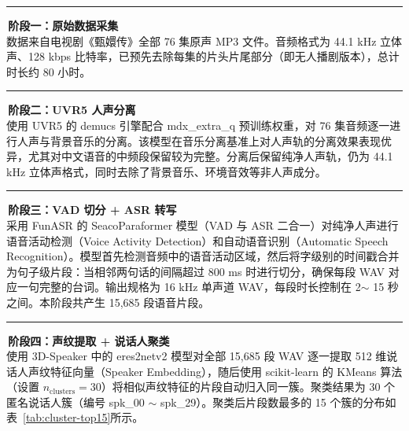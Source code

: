 \documentclass[12pt,a4paper]{article}
\begin{document}
{\color{Amid}\rule{4pt}{0pt}}\,\textbf{\color{Amid}阶段一：原始数据采集}\\[3pt]
\hspace*{2em}数据来自电视剧《甄嬛传》全部 76 集原声 MP3 文件。音频格式为 44.1 kHz 立体声、128 kbps 比特率，已预先去除每集的片头片尾部分（即无人播剧版本），总计时长约 80 小时。

{\color{Amid}\rule{4pt}{0pt}}\,\textbf{\color{Amid}阶段二：UVR5 人声分离}\\[3pt]
\hspace*{2em}使用 UVR5\cite{uvr5} 的 demucs\cite{defossez2021demucs} 引擎配合 mdx\_extra\_q 预训练权重，对 76 集音频逐一进行人声与背景音乐的分离。该模型在音乐分离基准上对人声轨的分离效果表现优异，尤其对中文语音的中频段保留较为完整。分离后保留纯净人声轨，仍为 44.1 kHz 立体声格式，同时去除了背景音乐、环境音效等非人声成分。

{\color{Amid}\rule{4pt}{0pt}}\,\textbf{\color{Amid}阶段三：VAD 切分 + ASR 转写}\\[3pt]
\hspace*{2em}采用 FunASR\cite{funasr} 的 SeacoParaformer 模型（VAD 与 ASR 二合一）对纯净人声进行语音活动检测（Voice Activity Detection）和自动语音识别（Automatic Speech Recognition）。模型首先检测音频中的语音活动区域，然后将字级别的时间戳合并为句子级片段：当相邻两句话的间隔超过 800 ms 时进行切分，确保每段 WAV 对应一句完整的台词。输出规格为 16 kHz 单声道 WAV，每段时长控制在 2$\sim$ 15 秒之间。本阶段共产生 15,685 段语音片段。

{\color{Amid}\rule{4pt}{0pt}}\,\textbf{\color{Amid}阶段四：声纹提取 + 说话人聚类}\\[3pt]
\hspace*{2em}使用 3D-Speaker\cite{3d-speaker} 中的 eres2netv2 模型对全部 15,685 段 WAV 逐一提取 512 维说话人声纹特征向量（Speaker Embedding），随后使用 scikit-learn\cite{sklearn} 的 KMeans 算法（设置 $n_\text{clusters}=30$）将相似声纹特征的片段自动归入同一簇。聚类结果为 30 个匿名说话人簇（编号 spk\_00 $\sim$  spk\_29）。聚类后片段数最多的 15 个簇的分布如表~\ref{tab:cluster-top15}所示。
\end{document}
